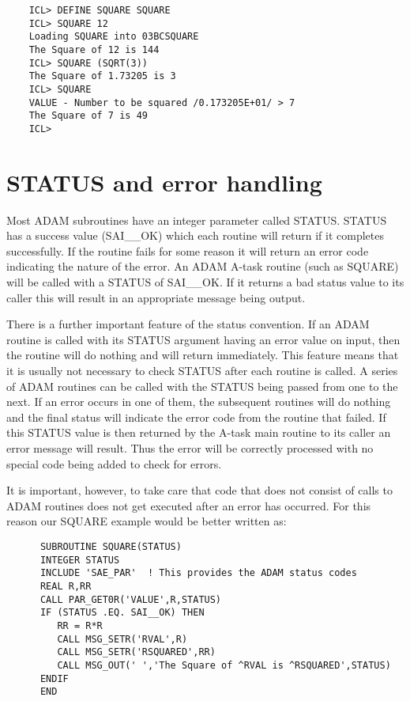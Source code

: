 \documentclass[twoside,11pt]{report}
\newcommand{\xlabel}[1]{}
\begin{document}
\begin{verbatim}
    ICL> DEFINE SQUARE SQUARE
    ICL> SQUARE 12
    Loading SQUARE into 03BCSQUARE
    The Square of 12 is 144
    ICL> SQUARE (SQRT(3))
    The Square of 1.73205 is 3
    ICL> SQUARE
    VALUE - Number to be squared /0.173205E+01/ > 7
    The Square of 7 is 49
    ICL>         
\end{verbatim}

\section{\xlabel{status_and_error_handling}STATUS and error handling}

Most ADAM subroutines have an integer parameter called STATUS. STATUS has a
success value (SAI\_\_OK) which each routine will return if it completes
successfully. If the routine fails for some reason it will return an error code
indicating the nature of the error. An ADAM A-task routine (such as SQUARE)
will be called with a STATUS of SAI\_\_OK. If it returns a bad status value to
its caller this will result in an appropriate message being output.

There is a further important feature of the status convention. If an
ADAM routine is called with its STATUS argument having an error value
on input, then the routine will do nothing and will return immediately.
This feature means that it is usually not necessary to check STATUS
after each routine is called. A series of ADAM routines can be called
with the STATUS being passed from one to the next. If an error occurs in
one of them, the subsequent routines will do nothing and the final status
will indicate the error code from the routine that failed. If this STATUS
value is then returned by the A-task main routine to its caller an error
message will result. Thus the error will be correctly processed with no
special code being added to check for errors.

It is important, however, to take care that code that does not consist of
calls to ADAM routines does not get executed after an error has occurred.
For this reason our SQUARE example would be better written as:

\begin{verbatim}
      SUBROUTINE SQUARE(STATUS)
      INTEGER STATUS
      INCLUDE 'SAE_PAR'  ! This provides the ADAM status codes
      REAL R,RR
      CALL PAR_GET0R('VALUE',R,STATUS)                        
      IF (STATUS .EQ. SAI__OK) THEN
         RR = R*R           
         CALL MSG_SETR('RVAL',R)
         CALL MSG_SETR('RSQUARED',RR)
         CALL MSG_OUT(' ','The Square of ^RVAL is ^RSQUARED',STATUS)
      ENDIF
      END
\end{verbatim}                                               
         
\end{document}
